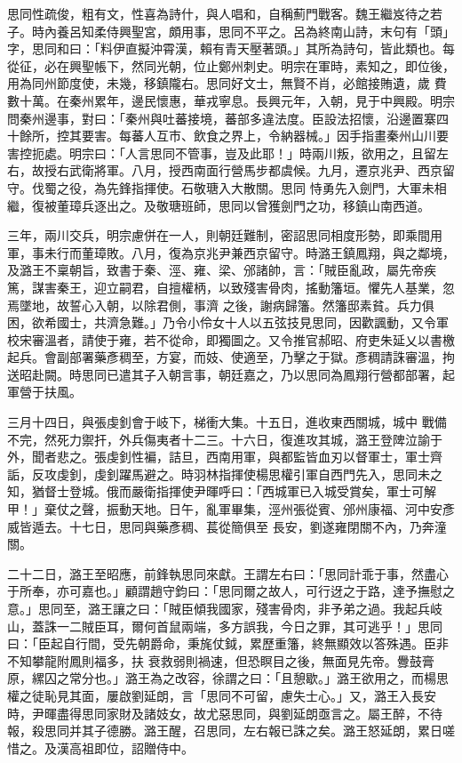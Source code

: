 \begin{pinyinscope}
 思同性疏俊，粗有文，性喜為詩什，與人唱和，自稱薊門戰客。魏王繼岌待之若子。時內養呂知柔侍興聖宮，頗用事，思同不平之。呂為終南山詩，末句有「頭」字，思同和曰：「料伊直擬沖霄漢，賴有青天壓著頭。」其所為詩句，皆此類也。每從征，必在興聖帳下，然同光朝，位止鄭州刺史。明宗在軍時，素知之，即位後，用為同州節度使，未幾，移鎮隴右。思同好文士，無賢不肖，必館接賄遺，歲
 費數十萬。在秦州累年，邊民懷惠，華戎寧息。長興元年，入朝，見于中興殿。明宗問秦州邊事，對曰：「秦州與吐蕃接境，蕃部多違法度。臣設法招懷，沿邊置寨四十餘所，控其要害。每蕃人互市、飲食之界上，令納器械。」因手指畫秦州山川要害控扼處。明宗曰：「人言思同不管事，豈及此耶！」時兩川叛，欲用之，且留左右，故授右武衛將軍。八月，授西南面行營馬步都虞候。九月，遷京兆尹、西京留守。伐蜀之役，為先鋒指揮使。石敬瑭入大散關。思同
 恃勇先入劍門，大軍未相繼，復被董璋兵逐出之。及敬瑭班師，思同以曾獲劍門之功，移鎮山南西道。



 三年，兩川交兵，明宗慮併在一人，則朝廷難制，密詔思同相度形勢，即乘間用軍，事未行而董璋敗。八月，復為京兆尹兼西京留守。時潞王鎮鳳翔，與之鄰境，及潞王不稟朝旨，致書于秦、涇、雍、梁、邠諸帥，言：「賊臣亂政，屬先帝疾篤，謀害秦王，迎立嗣君，自擅權柄，以致殘害骨肉，搖動籓垣。懼先人基業，忽焉墜地，故誓心入朝，以除君側，事濟
 之後，謝病歸籓。然籓邸素貧。兵力俱困，欲希國士，共濟急難。」乃令小伶女十人以五弦技見思同，因歡諷動，又令軍校宋審溫者，請使于雍，若不從命，即獨圖之。又令推官郝昭、府吏朱延乂以書檄起兵。會副部署藥彥稠至，方宴，而妓、使適至，乃擊之于獄。彥稠請誅審溫，拘送昭赴闕。時思同已遣其子入朝言事，朝廷嘉之，乃以思同為鳳翔行營都部署，起軍營于扶風。



 三月十四日，與張虔釗會于岐下，梯衝大集。十五日，進收東西關城，城中
 戰備不完，然死力禦扞，外兵傷夷者十二三。十六日，復進攻其城，潞王登陴泣諭于外，聞者悲之。張虔釗性褊，詰旦，西南用軍，與都監皆血刃以督軍士，軍士齊詬，反攻虔釗，虔釗躍馬避之。時羽林指揮使楊思權引軍自西門先入，思同未之知，猶督士登城。俄而嚴衛指揮使尹暉呼曰：「西城軍已入城受賞矣，軍士可解甲！」棄仗之聲，振動天地。日午，亂軍畢集，涇州張從賓、邠州康福、河中安彥威皆遁去。十七日，思同與藥彥稠、萇從簡俱至
 長安，劉遂雍閉關不內，乃奔潼關。



 二十二日，潞王至昭應，前鋒執思同來獻。王謂左右曰：「思同計乖于事，然盡心于所奉，亦可嘉也。」顧謂趙守鈞曰：「思同爾之故人，可行迓之于路，達予撫慰之意。」思同至，潞王讓之曰：「賊臣傾我國家，殘害骨肉，非予弟之過。我起兵岐山，蓋誅一二賊臣耳，爾何首鼠兩端，多方誤我，今日之罪，其可逃乎！」思同曰：「臣起自行間，受先朝爵命，秉旄仗鉞，累歷重籓，終無顯效以答殊遇。臣非不知攀龍附鳳則福多，扶
 衰救弱則禍速，但恐瞑目之後，無面見先帝。釁鼓膏原，縲囚之常分也。」潞王為之改容，徐謂之曰：「且憩歇。」潞王欲用之，而楊思權之徒恥見其面，屢啟劉延朗，言「思同不可留，慮失士心。」又，潞王入長安時，尹暉盡得思同家財及諸妓女，故尤惡思同，與劉延朗亟言之。屬王醉，不待報，殺思同并其子德勝。潞王醒，召思同，左右報已誅之矣。潞王怒延朗，累日嗟惜之。及漢高祖即位，詔贈侍中。




\end{pinyinscope}
